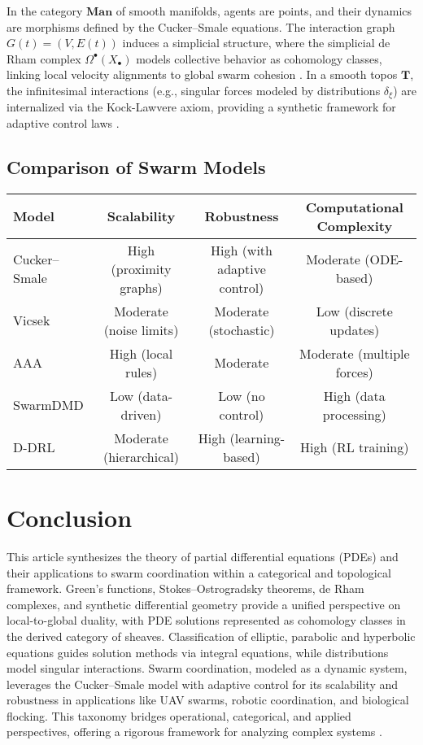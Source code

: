 \documentclass{article}
\theoremstyle{plain}
\newcommand{\cat}[1]{\mathbf{#1}}
\begin{document}
In the category \(\cat{Man}\) of smooth manifolds, agents are points, and their dynamics are
morphisms defined by the Cucker--Smale equations. The interaction graph \(G(t) = (V, E(t))\)
induces a simplicial structure, where the simplicial de Rham complex \(\Omega^\bullet(X_\bullet)\)
models collective behavior as cohomology classes, linking local velocity alignments to global swarm
cohesion \cite{nLab_simplicial_de_Rham}. In a smooth topos \(\cat{T}\), the infinitesimal
interactions (e.g., singular forces modeled by distributions \(\delta_\xi\)) are
internalized via the Kock-Lawvere axiom, providing a synthetic framework for
adaptive control laws \cite{nLab_synthetic_diff_geom}.

\subsection{Comparison of Swarm Models}
\hspace*{-2cm}
\begin{tabular}{lccc}
\hline
\textbf{Model} & \textbf{Scalability} & \textbf{Robustness} & \textbf{Computational Complexity} \\
\hline
Cucker--Smale & High (proximity graphs) & High (with adaptive control) & Moderate (ODE-based) \\
Vicsek & Moderate (noise limits) & Moderate (stochastic) & Low (discrete updates) \\
AAA & High (local rules) & Moderate & Moderate (multiple forces) \\
SwarmDMD & Low (data-driven) & Low (no control) & High (data processing) \\
D-DRL & Moderate (hierarchical) & High (learning-based) & High (RL training) \\
\hline
\end{tabular}

\section{Conclusion}
This article synthesizes the theory of partial differential equations (PDEs)
and their applications to swarm coordination within a categorical and topological framework.
Green's functions, Stokes--Ostrogradsky theorems, de Rham complexes, and synthetic
differential geometry provide a unified perspective on local-to-global duality,
with PDE solutions represented as cohomology classes in the derived category of sheaves.
Classification of elliptic, parabolic and hyperbolic equations guides solution methods via
integral equations, while distributions model singular interactions. Swarm coordination,
modeled as a dynamic system, leverages the Cucker--Smale model with adaptive control for
its scalability and robustness in applications like UAV swarms, robotic coordination,
and biological flocking. This taxonomy bridges operational, categorical, and applied
perspectives, offering a rigorous framework for analyzing complex systems \cite{nLab_synthetic_diff_geom, nLab_de_Rham_theorem}.
\end{document}
